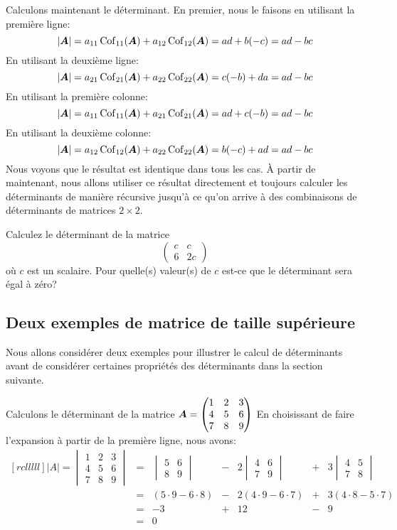 Calculons maintenant le déterminant.  En premier, nous le faisons en
utilisant la première ligne:
\[
|\boldsymbol{A}| = a_{11}\operatorname{Cof}_{11}(\boldsymbol{A}) + a_{12}\operatorname{Cof}_{12}(\boldsymbol{A}) = ad + b(-c) = ad-bc
\]
En utilisant la deuxième ligne:
\[
|\boldsymbol{A}| = a_{21}\operatorname{Cof}_{21}(\boldsymbol{A})+ a_{22}\operatorname{Cof}_{22}(\boldsymbol{A})= c(-b) + da = ad-bc
\]
En utilisant la première colonne:
\[
|\boldsymbol{A}| = a_{11}\operatorname{Cof}_{11}(\boldsymbol{A}) + a_{21}\operatorname{Cof}_{21}(\boldsymbol{A})= ad + c(-b) = ad-bc
\]
En utilisant la deuxième colonne:
\[
|\boldsymbol{A}| = a_{12}\operatorname{Cof}_{12}(\boldsymbol{A}) + a_{22}\operatorname{Cof}_{22}(\boldsymbol{A})= b(-c) + ad = ad-bc
\]
Nous voyons que le résultat est identique dans tous les cas.  À partir de maintenant, nous allons utiliser ce résultat
directement et toujours calculer les déterminants de manière récursive jusqu'à ce qu'on arrive à des combinaisons
de déterminants de matrices $2\times 2$.

\begin{exerciceC}
Calculez le déterminant de la matrice
\[
\begin{pmatrix}
c & c \\
6 & 2c
\end{pmatrix}
\]
où $c$ est un scalaire.  Pour quelle(s) valeur(s) de $c$ est-ce que le déterminant sera égal à zéro?
\end{exerciceC}


\subsection{Deux exemples de matrice de taille supérieure}

Nous allons considérer deux exemples pour illustrer le calcul de déterminants avant de
considérer certaines propriétés des déterminants dans la section suivante.
\begin{exemple}
Calculons le déterminant de la matrice $
\displaystyle \boldsymbol{A} = \begin{pmatrix}
1 & 2 & 3 \\
4 & 5 & 6 \\
7 & 8 & 9
\end{pmatrix}
$
En choisissant de faire l'expansion à partir de la première ligne, nous avons:
\[
\begin{matrix}[rclllll]
|A| =
\begin{vmatrix}
1 & 2 & 3 \\
4 & 5 & 6 \\
7 & 8 & 9
\end{vmatrix}
&=& \begin{vmatrix}
5 & 6 \\
8 & 9
\end{vmatrix}
&-&2 \begin{vmatrix}
4 & 6 \\
7 & 9
\end{vmatrix}
&+&3 \begin{vmatrix}
4 & 5 \\
7 & 8
\end{vmatrix}
\\
&=& (5\cdot 9 - 6\cdot 8) &-&2(4\cdot9 - 6\cdot7) &+& 3(4\cdot8 - 5\cdot7) \\
&=& -3 & +&12 & -&9 \\
&=& 0
\end{matrix}
\]
\end{exemple}

